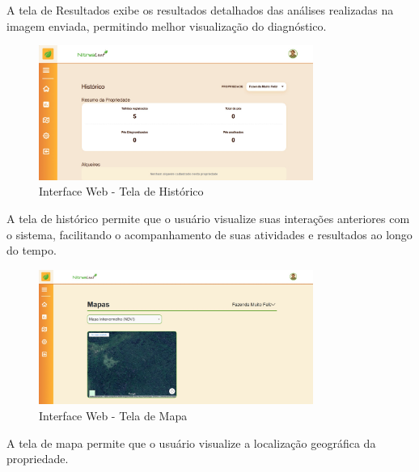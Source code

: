A tela de Resultados exibe os resultados detalhados das análises realizadas na
imagem enviada, permitindo melhor visualização do diagnóstico.
\medskip

\begin{figure}[H]
\centering
\caption{Interface Web - Tela de Histórico}
\label{fig:interface-web-tela-historico}
\includegraphics[width=0.8\textwidth]{Images/AppHistorico.jpeg}
\end{figure}

A tela de histórico permite que o usuário visualize suas interações anteriores com o sistema, 
facilitando o acompanhamento de suas atividades e resultados ao longo do tempo.
\medskip


\begin{figure}[H]
\centering
\caption{Interface Web - Tela de Mapa}
\label{fig:interface-web-tela-mapa}
\includegraphics[width=0.8\textwidth]{Images/AppMapa.jpeg}
\end{figure}

A tela de mapa permite que o usuário visualize a localização geográfica da propriedade.
\medskip
